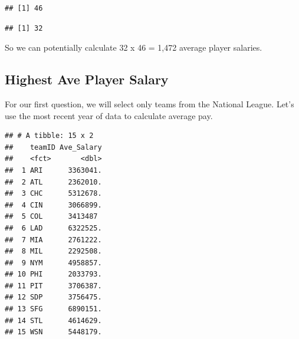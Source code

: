 \documentclass[]{book}
\newenvironment{Shaded}{\begin{snugshade}}{\end{snugshade}}
\newcommand{\DataTypeTok}[1]{\textcolor[rgb]{0.13,0.29,0.53}{#1}}
\newcommand{\DecValTok}[1]{\textcolor[rgb]{0.00,0.00,0.81}{#1}}
\newcommand{\KeywordTok}[1]{\textcolor[rgb]{0.13,0.29,0.53}{\textbf{#1}}}
\newcommand{\NormalTok}[1]{#1}
\newcommand{\OperatorTok}[1]{\textcolor[rgb]{0.81,0.36,0.00}{\textbf{#1}}}
\newcommand{\StringTok}[1]{\textcolor[rgb]{0.31,0.60,0.02}{#1}}
\theoremstyle{definition}
\theoremstyle{definition}
\theoremstyle{definition}
\theoremstyle{remark}
\begin{document}
\begin{Shaded}
\end{Shaded}

\begin{verbatim}
## [1] 46
\end{verbatim}

\begin{Shaded}
\end{Shaded}

\begin{verbatim}
## [1] 32
\end{verbatim}

So we can potentially calculate 32 x 46 = 1,472 average player salaries.

\hypertarget{highest-ave-player-salary}{%
\subsection{Highest Ave Player Salary}\label{highest-ave-player-salary}}

For our first question, we will select only teams from the National
League. Let's use the most recent year of data to calculate average pay.

\begin{Shaded}
\end{Shaded}

\begin{verbatim}
## # A tibble: 15 x 2
##    teamID Ave_Salary
##    <fct>       <dbl>
##  1 ARI      3363041.
##  2 ATL      2362010.
##  3 CHC      5312678.
##  4 CIN      3066899.
##  5 COL      3413487 
##  6 LAD      6322525.
##  7 MIA      2761222.
##  8 MIL      2292508.
##  9 NYM      4958857.
## 10 PHI      2033793.
## 11 PIT      3706387.
## 12 SDP      3756475.
## 13 SFG      6890151.
## 14 STL      4614629.
## 15 WSN      5448179.
\end{verbatim}
\end{document}
